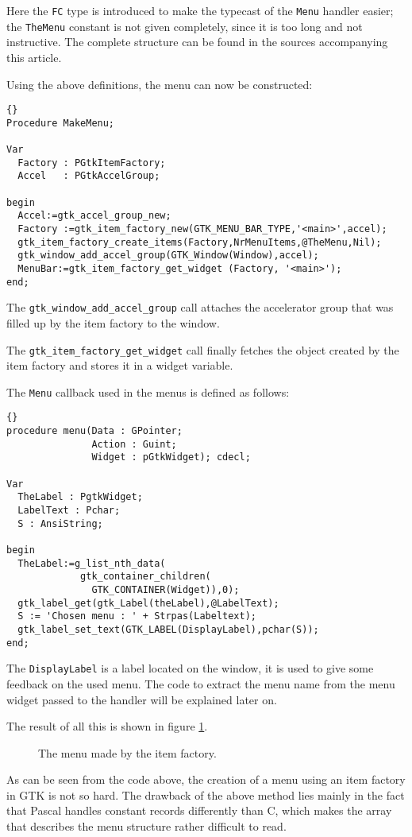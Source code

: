 \documentclass[10pt]{article}
\begin{document}
Here the \lstinline|FC| type is introduced to make the typecast of the
\lstinline|Menu| handler easier; the 
\lstinline|TheMenu| constant is not given completely, since it is too long
and not instructive. The complete structure can be found in the sources
accompanying this article.

Using the above definitions, the menu can now be constructed:
\begin{lstlisting}{}
Procedure MakeMenu;

Var
  Factory : PGtkItemFactory;
  Accel   : PGtkAccelGroup;

begin
  Accel:=gtk_accel_group_new;
  Factory :=gtk_item_factory_new(GTK_MENU_BAR_TYPE,'<main>',accel);
  gtk_item_factory_create_items(Factory,NrMenuItems,@TheMenu,Nil);
  gtk_window_add_accel_group(GTK_Window(Window),accel);
  MenuBar:=gtk_item_factory_get_widget (Factory, '<main>');
end;
\end{lstlisting}
The \lstinline|gtk_window_add_accel_group| call attaches the accelerator
group that was filled up by the item factory to the window.

The \lstinline|gtk_item_factory_get_widget| call finally fetches the
object created by the item factory and stores it in a widget variable.

The \lstinline|Menu| callback used in the menus is defined as follows:
\begin{lstlisting}{}
procedure menu(Data : GPointer; 
               Action : Guint; 
               Widget : pGtkWidget); cdecl;
    
Var 
  TheLabel : PgtkWidget;
  LabelText : Pchar;
  S : AnsiString;
     
begin
  TheLabel:=g_list_nth_data(
             gtk_container_children(
               GTK_CONTAINER(Widget)),0);
  gtk_label_get(gtk_Label(theLabel),@LabelText);
  S := 'Chosen menu : ' + Strpas(Labeltext);
  gtk_label_set_text(GTK_LABEL(DisplayLabel),pchar(S));
end;
\end{lstlisting}
The \lstinline|DisplayLabel| is a label located on the window, it is used to
give some feedback on the used menu. The code to extract the menu name from
the menu widget passed to the handler will be explained later on. 

The result of all this is shown in figure \ref{fig:ex1}.
\begin{figure}
\caption{The menu made by the item factory.}\label{fig:ex1}
\end{figure}

As can be seen from the code above, the creation of a menu using an item
factory in GTK is not so hard. The drawback of the above method lies mainly
in the fact that Pascal handles constant records differently than C, which 
makes the array that describes the menu structure rather difficult to read.
\end{document}
